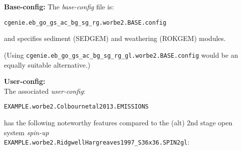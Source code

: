 \documentclass[10pt,twoside]{article}
\begin{document}
\noindent \textbf{Base-config:} The \textit{base-config} file is:
\vspace{-10pt}\begin{verbatim}cgenie.eb_go_gs_ac_bg_sg_rg.worbe2.BASE.config\end{verbatim}\vspace{-10pt}
and specifies sediment (SEDGEM) and weathering (ROKGEM) modules.

\noindent(Using \texttt{cgenie.eb\_go\_gs\_ac\_bg\_sg\_rg\_gl.worbe2.BASE.config} would be an equally suitable alternative.)

\noindent \textbf{User-config:} 
\\ The associated \textit{user-config}:
\vspace{-10pt}\begin{verbatim}EXAMPLE.worbe2.Colbournetal2013.EMISSIONS\end{verbatim}\vspace{-10pt}
has the following noteworthy features compared to the (alt) 2nd stage open system \textit{spin-up}
\\ \texttt{EXAMPLE.worbe2.RidgwellHargreaves1997\_S36x36.SPIN2gl}:
\end{document}
